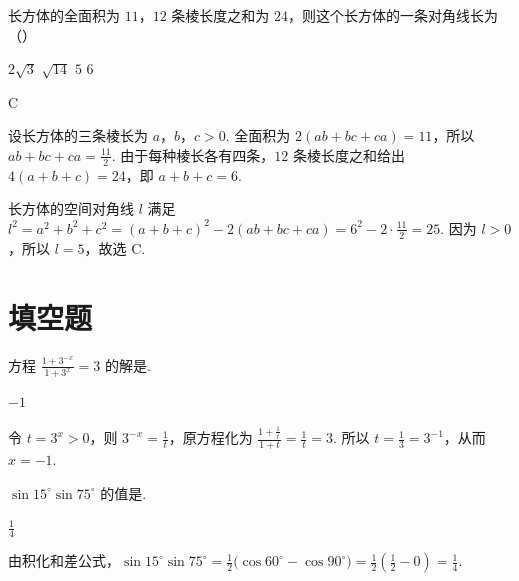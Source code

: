 \begin{problem}
长方体的全面积为 \(11\)，\(12\) 条棱长度之和为 \(24\)，则这个长方体的一条对角线长为（\quad）

\choices
    {\(2\sqrt{3}\)}
    {\(\sqrt{14}\)}
    {\(5\)}
    {\(6\)}

\begin{answer}
C
\end{answer}

\begin{solution}
设长方体的三条棱长为 \(a\)，\(b\)，\(c>0\). 全面积为 \(2(ab+bc+ca)=11\)，所以 \(ab+bc+ca=\frac{11}{2}\). 由于每种棱长各有四条，\(12\) 条棱长度之和给出 \(4(a+b+c)=24\)，即 \(a+b+c=6\).

长方体的空间对角线 \(l\) 满足
\(l^2=a^2+b^2+c^2=(a+b+c)^2-2(ab+bc+ca)=6^2-2\cdot\frac{11}{2}=25\). 因为 \(l>0\)，所以 \(l=5\)，故选 C.
\end{solution}
\end{problem}

\section{填空题}

\begin{problem}
方程 \(\frac{1+3^{-x}}{1+3^x}=3\) 的解是\fillinblank{}.

\begin{answer}
\(-1\)
\end{answer}

\begin{solution}
令 \(t=3^x>0\)，则 \(3^{-x}=\frac{1}{t}\)，原方程化为 \(\frac{1+\frac{1}{t}}{1+t}=\frac{1}{t}=3\). 所以 \(t=\frac{1}{3}=3^{-1}\)，从而 \(x=-1\).
\end{solution}
\end{problem}

\begin{problem}
\(\sin 15^{\circ}\sin 75^{\circ}\) 的值是\fillinblank{}.

\begin{answer}
\(\frac{1}{4}\)
\end{answer}

\begin{solution}
由积化和差公式，\(\sin15^{\circ}\sin75^{\circ}=\frac{1}{2}\bigl(\cos60^{\circ}-\cos90^{\circ}\bigr)=\frac{1}{2}\left(\frac{1}{2}-0\right)=\frac{1}{4}\).
\end{solution}
\end{problem}

